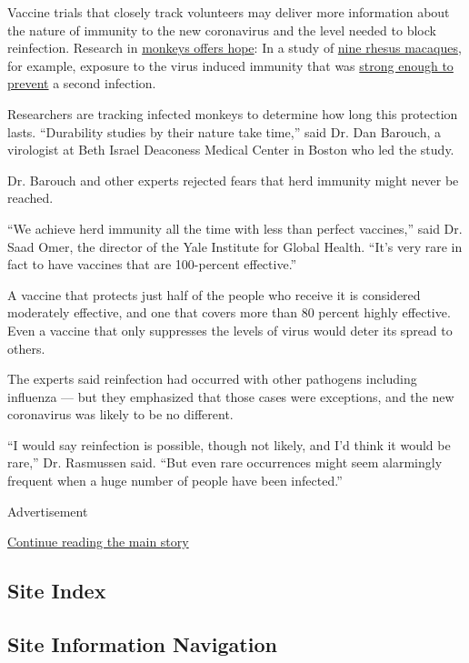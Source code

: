 Vaccine trials that closely track volunteers may deliver more
information about the nature of immunity to the new coronavirus and the
level needed to block reinfection. Research in
\href{https://science.sciencemag.org/content/early/2020/07/01/science.abc5343}{monkeys
offers hope}: In a study of
\href{https://science.sciencemag.org/content/early/2020/05/19/science.abc4776}{nine
rhesus macaques}, for example, exposure to the virus induced immunity
that was
\href{https://www.nytimes3xbfgragh.onion/2020/05/20/health/coronavirus-vaccine-harvard.html}{strong
enough to prevent} a second infection.

Researchers are tracking infected monkeys to determine how long this
protection lasts. ``Durability studies by their nature take time,'' said
Dr. Dan Barouch, a virologist at Beth Israel Deaconess Medical Center in
Boston who led the study.

Dr. Barouch and other experts rejected fears that herd immunity might
never be reached.

``We achieve herd immunity all the time with less than perfect
vaccines,'' said Dr. Saad Omer, the director of the Yale Institute for
Global Health. ``It's very rare in fact to have vaccines that are
100-percent effective.''

A vaccine that protects just half of the people who receive it is
considered moderately effective, and one that covers more than 80
percent highly effective. Even a vaccine that only suppresses the levels
of virus would deter its spread to others.

The experts said reinfection had occurred with other pathogens including
influenza --- but they emphasized that those cases were exceptions, and
the new coronavirus was likely to be no different.

``I would say reinfection is possible, though not likely, and I'd think
it would be rare,'' Dr. Rasmussen said. ``But even rare occurrences
might seem alarmingly frequent when a huge number of people have been
infected.''

Advertisement

\protect\hyperlink{after-bottom}{Continue reading the main story}

\hypertarget{site-index}{%
\subsection{Site Index}\label{site-index}}

\hypertarget{site-information-navigation}{%
\subsection{Site Information
Navigation}\label{site-information-navigation}}

